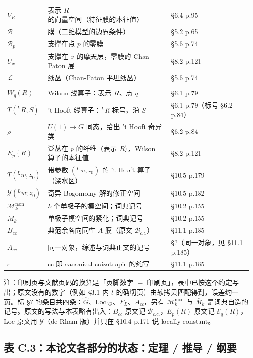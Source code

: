 \begin{longtable}{@{}p{3.4cm}p{7.4cm}p{4.3cm}@{}}
$V_R$ & 表示 $R$ 的向量空间（特征膜的本征值） & \S6.4 p.95 \\
$\mathcal B$ & 膜（二维模型的边界条件） & \S5.2 p.65 \\
$\mathcal B_p$ & 支撑在点 $p$ 的零膜 & \S5.5 p.74 \\
$U_x$ & 支撑在 $x$ 的摩天层，零膜的 Chan-Paton 层 & \S8.2 p.121 \\
$\mathcal L$ & 线丛（Chan-Paton 平坦线丛） & \S5.5 p.74 \\
\addlinespace[4pt]
\multicolumn{3}{@{}l}{\bfseries 五、算子与特殊记号}\\
\addlinespace[2pt]
$W_q(R)$ & Wilson 线算子：表示 $R$、点 $q$ & \S6.1 p.79 \\
$T({}^LR,S)$ & 't Hooft 线算子：${}^LR$ 标号，沿 $S$ & \S6.1 p.79（标号 \S6.2 p.84） \\
$\rho$ & $U(1)\to G$ 同态，给出 't Hooft 奇异类 & \S6.2 p.84 \\
$E_p(R)$ & 泛丛在 $p$ 的纤维（表示 $R$），Wilson 算子的本征值 & \S8.2 p.121 \\
$T({}^Lw,z_0)$ & 带参数 $({}^Lw,z_0)$ 的 't Hooft 算子（深水区） & \S10.5 p.179 \\
$\bar{\mathcal Y}({}^Lw;z_0)$ & 奇异 Bogomolny 解的修正空间 & \S10.5 p.182 \\
$\mathcal M^{\mathrm{mon}}_k$ & $k$ 个单极子的模空间；词典记号 & \S10.2 p.155 \\
$\bar M_k$ & 单极子模空间的紧化；词典记号 & \S10.2 p.155 \\
$B_{cc}$ & 典范余各向同性 $A$-膜（原文 $\mathcal B_{c.c.}$） & \S11.1 p.185 \\
$A_{cc}$ & 同一对象，综述与词典正文的记号 & \S?（同一对象，见 \S11.1 p.185） \\
$c$ & $cc$ 即 canonical coisotropic 的缩写 & \S11.1 p.185 \\

\end{longtable}
\endgroup

注：印刷页与文献页码的换算是「页脚数字 $=$ 印刷页」，表中已按这个约定写出；原文没有的数字（例如 \S3.1 内 $t$ 的确切页）由软拷贝匹配得到，误差约一页。标 \S? 的条目共四条：$\hat G$、$\mathrm{Loc}_{{}^LG}$、$F_E$、$A_{cc}$，另有 $\mathcal M^{\mathrm{mon}}_k$ 与 $\bar M_k$ 是词典自造的记号。原文的写法与本表略有出入：$B_{cc}$ 原文记 $\mathcal B_{c.c.}$，$E_p(R)$ 原文记 $\mathcal E_q(R)$，$\mathrm{Loc}$ 原文用 $\mathcal Y$（de Rham 版）并只在 \S10.4 p.171 说 locally constant。

\subsection{表 C.3：本论文各部分的状态：定理 / 推导 / 纲要}

